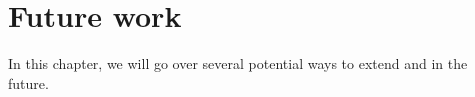 \chapter{Future work}

In this chapter, we will go over several potential ways to extend \Chick{} and
\Coop{} in the future.




%
